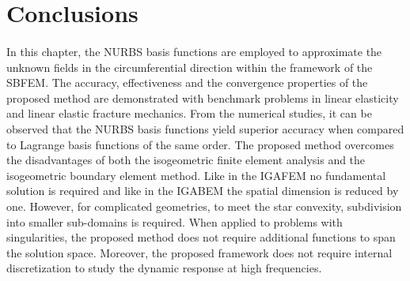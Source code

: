 













\section{Conclusions}
\paragraph{}
In this chapter, the NURBS basis functions are employed to approximate the unknown fields in the circumferential direction within the framework of the SBFEM.
The accuracy, effectiveness and the convergence properties of the proposed method are demonstrated with benchmark problems in linear elasticity and linear elastic fracture mechanics.
From the numerical studies, it can be observed that the NURBS basis functions yield superior accuracy when compared to Lagrange basis functions of the same order.
The proposed method overcomes the disadvantages of both the isogeometric finite element analysis and the isogeometric boundary element method. 
Like in the IGAFEM no fundamental solution is required and like in the IGABEM the spatial dimension is reduced by one.
However, for complicated geometries, to meet the star convexity, subdivision into smaller sub-domains is required.
When applied to problems with singularities, the proposed method does not require additional functions to span the solution space.
Moreover, the proposed framework does not require internal discretization to study the dynamic response at high frequencies.
